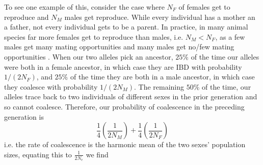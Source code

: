 To see one example of this, consider the case where $N_F$ of  females get to reproduce and $N_M$ males get reproduce.
While every individual has a mother an a father, not every individual gets to be a parent. In practice, in many animal species far more females get to reproduce than males, i.e. $N_M <N_F$, as a few males get many mating opportunities and many males get no/few mating opportunities \citep[see ][for a broad analysis, and note that there a certainly many exceptions to this general pattern]{janicke:16}. When our two alleles pick an ancestor, $25\%$ of the time our alleles were both in a female ancestor, in which case they are IBD with probability $1/(2N_F)$, and $25\%$ of the time they are both in a
male ancestor, in which case they coalesce with probability
$1/(2N_M)$.
The remaining $50\%$ of the time, our alleles trace back to two individuals of different sexes in the prior generation and so cannot coalesce.  Therefore, our probability of coalescence in the preceding generation is
\begin{equation}
\frac{1}{4}\left(\frac{1}{2N_M} \right)+\frac{1}{4}\left(\frac{1}{2N_F} \right) %
\end{equation}
i.e. the rate of coalescence is the harmonic mean of the two sexes' population sizes, equating this to $\frac{1}{2N_e}$ we find

